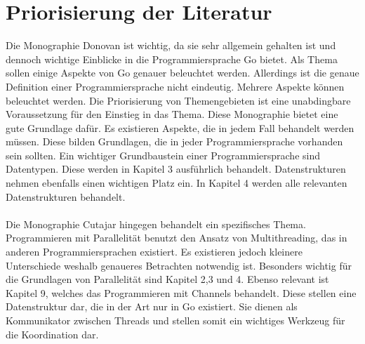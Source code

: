 \makeatletter\@openrightfalse
\chapter{Priorisierung der Literatur}\label{ch:litprio}
Die Monographie Donovan\cite{donovan_go_2016} ist wichtig, da sie sehr allgemein gehalten ist und dennoch\- wich\-tige Einblicke in die Programmier\-sprache Go bietet. Als Thema sollen einige Aspekte von Go genauer beleuchtet werden. Allerdings ist die genaue Definition einer Pro\-gram\-mier\-sprache nicht eindeutig. Mehrere Aspekte können beleuchtet werden. Die Priorisierung von Themengebieten ist eine unabdingbare Voraussetzung für den Einstieg in das Thema. Diese Monographie bietet eine gute Grundlage dafür. Es existieren Aspekte\mbox, die in jedem Fall behandelt werden müssen. Diese bilden Grundlagen, die in jeder Programmier\-sprache vorhanden sein sollten.  Ein wichtiger Grundbaustein einer Programmiersprache sind Datentypen. Diese werden in Kapitel 3 ausführlich behandelt. Datenstrukturen nehmen ebenfalls einen wichtigen Platz ein. In Kapitel 4 werden alle relevanten Datenstrukturen behandelt.\cite{donovan_go_2016}
\\ 
\\Die Monographie Cutajar\cite{cutajar_learn_2024} hingegen behandelt ein spezifisches Thema. Programmieren mit Parallelität benutzt den Ansatz von Multithreading, das in anderen Programmiersprachen existiert. Es existieren jedoch kleinere Unterschiede weshalb genaueres Betrachten notwendig ist. Besonders wichtig für die Grundlagen von Parallelität sind Kapitel 2,3 und 4. Ebenso relevant ist Kapitel 9, welches das Programmieren mit Channels behandelt. Diese stellen eine Datenstruktur dar, die in der Art nur in Go existiert. Sie dienen als Kommunikator zwischen Threads und stellen somit ein wichtiges Werkzeug für die Koordination dar.\cite{cutajar_learn_2024}
\@openrighttrue\makeatother 

